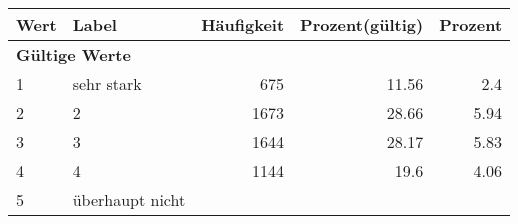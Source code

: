      \begin{longtable}{lXrrr}
     \toprule
     \textbf{Wert} & \textbf{Label} & \textbf{Häufigkeit} & \textbf{Prozent(gültig)} & \textbf{Prozent} \\
     \endhead
     \midrule
     \multicolumn{5}{l}{\textbf{Gültige Werte}}\\

     1 &
     \multicolumn{1}{X}{ sehr stark   } &


       \num{675} &
       \num[round-mode=places,round-precision=2]{11,56} &
         \num[round-mode=places,round-precision=2]{2,4} \\

     2 &
     \multicolumn{1}{X}{ 2   } &


       \num{1673} &
       \num[round-mode=places,round-precision=2]{28,66} &
         \num[round-mode=places,round-precision=2]{5,94} \\

     3 &
     \multicolumn{1}{X}{ 3   } &


       \num{1644} &
       \num[round-mode=places,round-precision=2]{28,17} &
         \num[round-mode=places,round-precision=2]{5,83} \\

     4 &
     \multicolumn{1}{X}{ 4   } &


       \num{1144} &
       \num[round-mode=places,round-precision=2]{19,6} &
         \num[round-mode=places,round-precision=2]{4,06} \\

     5 &
     \multicolumn{1}{X}{ überhaupt nicht   } &



\end{longtable}
